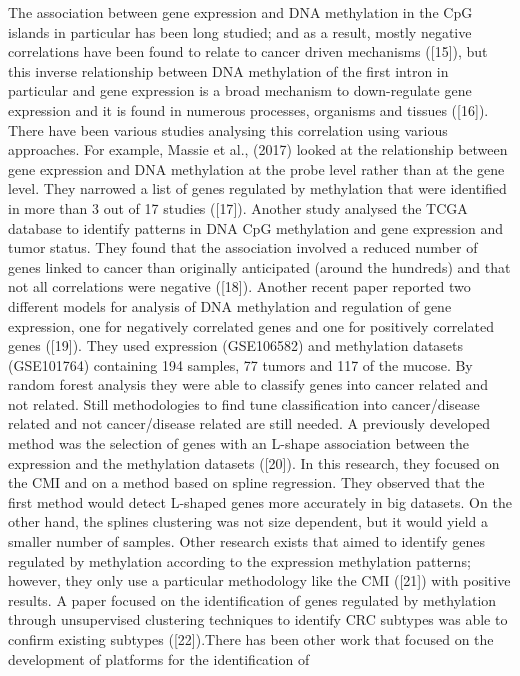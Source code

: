 \documentclass[10pt,letterpaper]{article}
\begin{document}
The association between gene expression and DNA methylation in the CpG
islands in particular has been long studied; and as a result, mostly
negative correlations have been found to relate to cancer driven
mechanisms ({[}15{]}), but this inverse relationship between DNA
methylation of the first intron in particular and gene expression is a
broad mechanism to down-regulate gene expression and it is found in
numerous processes, organisms and tissues ({[}16{]}). There have been
various studies analysing this correlation using various approaches. For
example, Massie et al., (2017) looked at the relationship between gene
expression and DNA methylation at the probe level rather than at the
gene level. They narrowed a list of genes regulated by methylation that
were identified in more than 3 out of 17 studies ({[}17{]}). Another
study analysed the TCGA database to identify patterns in DNA CpG
methylation and gene expression and tumor status. They found that the
association involved a reduced number of genes linked to cancer than
originally anticipated (around the hundreds) and that not all
correlations were negative ({[}18{]}). Another recent paper reported two
different models for analysis of DNA methylation and regulation of gene
expression, one for negatively correlated genes and one for positively
correlated genes ({[}19{]}). They used expression (GSE106582) and
methylation datasets (GSE101764) containing 194 samples, 77 tumors and
117 of the mucose. By random forest analysis they were able to classify
genes into cancer related and not related. Still methodologies to find
tune classification into cancer/disease related and not cancer/disease
related are still needed. A previously developed method was the
selection of genes with an L-shape association between the expression
and the methylation datasets ({[}20{]}). In this research, they focused
on the CMI and on a method based on spline regression. They observed
that the first method would detect L-shaped genes more accurately in big
datasets. On the other hand, the splines clustering was not size
dependent, but it would yield a smaller number of samples. Other
research exists that aimed to identify genes regulated by methylation
according to the expression methylation patterns; however, they only use
a particular methodology like the CMI ({[}21{]}) with positive results.
A paper focused on the identification of genes regulated by methylation
through unsupervised clustering techniques to identify CRC subtypes was
able to confirm existing subtypes ({[}22{]}).There has been other work
that focused on the development of platforms for the identification of
\end{document}
